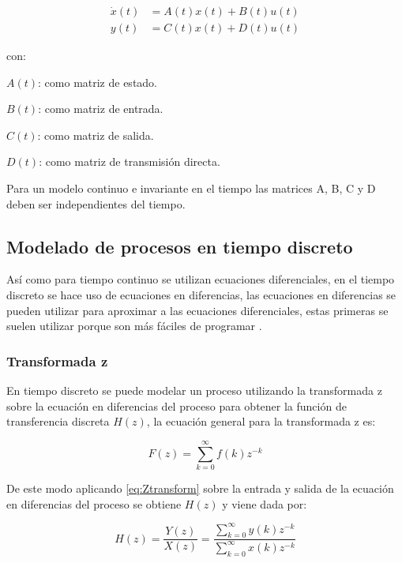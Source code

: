 			\begin{align}\label{eq:SSrepresentation}
				\dot{x}(t) &= A(t)x(t) + B(t)u(t) \\
				y(t) &= C(t)x(t) + D(t)u(t)
			\end{align}
			
			\begin{spacing}{1.5}
				con: 
				
				$A(t)$: como matriz de estado.
				
				$B(t)$: como matriz de entrada.
				
				$C(t)$: como matriz de salida.
				
				$D(t)$: como matriz de transmisión directa.
				
			\end{spacing}
			
			Para un modelo continuo e invariante en el tiempo las matrices A, B, C y D deben ser independientes del tiempo.
			
	\subsection{Modelado de procesos en tiempo discreto}
	
		Así como para tiempo continuo se utilizan ecuaciones diferenciales, en el tiempo discreto se hace uso de ecuaciones en diferencias, las ecuaciones en diferencias se pueden utilizar para aproximar a las ecuaciones diferenciales, estas primeras se suelen utilizar porque son más fáciles de programar \Parencite{kuo1996sistemas}.
	
		\subsubsection{Transformada z}
		
			En tiempo discreto se puede modelar un proceso utilizando la transformada z sobre la ecuación en diferencias del proceso para obtener la función de transferencia discreta $H(z)$, la ecuación general para la transformada z es:
			
			\begin{equation}\label{eq:Ztransform}
				F(z)= \sum\limits_{k=0}^{\infty}f(k)z^{-k}
			\end{equation}
			
			De este modo aplicando \cref{eq:Ztransform} sobre la entrada y salida de la ecuación en diferencias del proceso se obtiene $H(z)$ y viene dada por:
			
			\begin{equation}\label{eq:ZTransfer}
			H(z) =	\frac{Y(z)}{X(z)} = \frac{\displaystyle\sum\limits_{k=0}^{\infty}y(k)z^{-k}}{\displaystyle\sum\limits_{k=0}^{\infty}x(k)z^{-k}}
			\end{equation}
		

